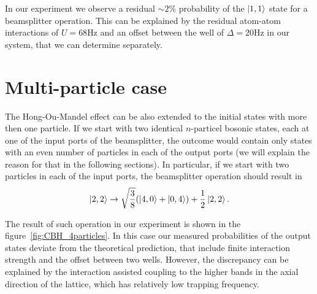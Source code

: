 In our experiment we observe a residual $\sim 2\%$ probability of the $\left|1,1\right\rangle$ state for a beamsplitter operation. This can be explained by the residual atom-atom interactions of $U=68\textrm{Hz}$ and an offset between the well of $\Delta = 20\textrm{Hz}$ in our system, that we can determine separately.

\section{Multi-particle case}
The Hong-Ou-Mandel effect can be also extended to the initial states with more then one particle. If we start with two identical $n\textrm{-particel}$ bosonic states, each at one of the input ports of the beamsplitter, the outcome would contain only states with an even number of particles in each of the output ports (we will explain the reason for that in the following sections). In particular, if we start with two particles in each of the input ports, the beamsplitter operation should result in
\begin{equation}
\left|2,2\right\rangle\rightarrow \sqrt{\frac{3}{8}}(\left|4,0\right\rangle+\left|0,4\right\rangle)+\frac{1}{2} \left|2,2\right\rangle.
\end{equation}

The result of such operation in our experiment is shown in the figure~\ref{fig:CBH_4particles}. In this case our measured probabilities of the output states deviate from the theoretical prediction, that include finite interaction strength and the offset between two wells. However, the discrepancy can be explained by the interaction assisted coupling to the higher bands in the axial direction of the lattice, which has relatively low trapping frequency.

